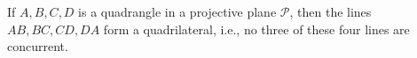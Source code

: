 If $A, B, C, D$ is a quadrangle in a projective plane $\mathcal{P}$, then the lines $AB, BC, CD, DA$ form a quadrilateral, i.e., no three of these four lines are concurrent.
